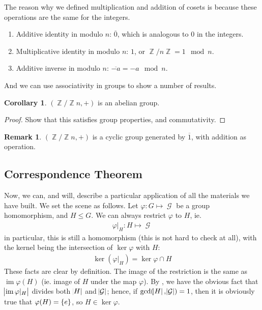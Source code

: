 \documentclass[11pt]{amsart} %
\theoremstyle{definition}
\newtheorem{corollary}[definition]{Corollary}
\theoremstyle{definition}
\newtheorem{remark}[definition]{Remark}
\DeclareMathOperator{\Z}{\mathbb{Z}}
\DeclareMathOperator{\GG}{\mathcal{G}}
\DeclareMathOperator{\im}{im}
\numberwithin{equation}{section}
\begin{document}
The reason why we defined multiplication and addition of cosets is because these operations are the same for the integers.
\begin{enumerate}%
	\item Additive identity in modulo $n$: $\overline{0}$, which is analogous to $0$ in the integers.
	\item Multiplicative identity in modulo $n$: $1$, or $\Z / n\Z = 1 \mod n$. 
	\item Additive inverse in modulo $n$: $\overline{-a} = -a \mod n$.
\end{enumerate}
And we can use associativity in groups to show a number of results.

\begin{corollary}
	$(\Z / \Z n , + )$ is an abelian group.
\end{corollary}

\begin{proof}
	Show that this satisfies group properties, and commutativity.
\end{proof}

\begin{remark}
	$(\Z / \Z n , + )$ is a cyclic group generated by $\overline{1}$, with addition as operation.
\end{remark}


\subsection{Correspondence Theorem}
Now, we can, and will, describe a particular application of all the materials we have built. We set the scene as follows. Let $\varphi : G \mapsto \GG$ be a group homomorphism, and $H \leq G$. We can always restrict $\varphi$ to $H$, ie.
\begin{align*}
\varphi|_{H} :  H \mapsto \GG
\end{align*}
in particular, this is still a homomorphism (this is not hard to check at all), with the kernel being the intersection of $\ker \varphi$ with $H$:
\begin{align*}
\ker (\varphi|_H ) = \ker \varphi \cap H
\end{align*}
These facts are clear by definition. The image of the restriction is the same as $\im \varphi(H)$ (ie. image of $H$ under the map $\varphi$). By , we have the obvious fact that $\abs{\im \varphi|_{H}} $ divides both $\abs{H}$ and $\abs{\GG}$; hence, if $\gcd(\abs{H},\abs{\GG}) =1$, then it is obviously true that $\varphi(H) = \set{e}$, so $H \in \ker \varphi$.
\end{document}
